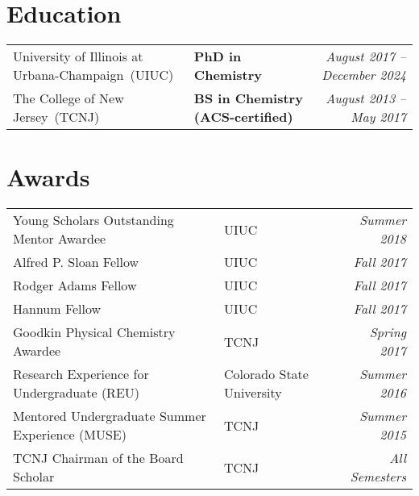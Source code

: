 \documentclass[letterpaper,10pt]{article}
\newcommand{\sectionspace}{
\vspace{-17pt}
}
\begin{document}
\section{\textcolor{color1}{Education}}
\vspace{-3pt}
{
	\setlength\tabcolsep{0pt}
	\begin{tabular*}{\linewidth}{@{\extracolsep{\fill}} llr}
		University of Illinois at Urbana-Champaign~(UIUC) & \textbf{PhD in Chemistry} & \textcolor{color2}{\textit{August 2017 -- December 2024}}\\
		The College of New Jersey~(TCNJ) & \textbf{BS in Chemistry (ACS-certified)} & \textcolor{color2}{\textit{August 2013 -- May 2017}}\\
	\end{tabular*}
}
\sectionspace
\vspace{3pt}

\section{\textcolor{color1}{Awards}}
{
	\setlength\tabcolsep{0pt}
	\begin{tabular*}{\linewidth}{@{\extracolsep{\fill}} llr}
		Young Scholars Outstanding Mentor Awardee & UIUC & \textcolor{color2}{\textit{Summer 2018}}\\
		Alfred P. Sloan Fellow & UIUC & \textcolor{color2}{\textit{Fall 2017}}\\
		Rodger Adams Fellow & UIUC & \textcolor{color2}{\textit{Fall 2017}}\\
		Hannum Fellow & UIUC & \textcolor{color2}{\textit{Fall 2017}}\\
		Goodkin Physical Chemistry Awardee & TCNJ & \textcolor{color2}{\textit{Spring 2017}}\\
		Research Experience for Undergraduate (REU) & Colorado State University & \textcolor{color2}{\textit{Summer 2016}}\\
		Mentored Undergraduate Summer Experience (MUSE) & TCNJ & \textcolor{color2}{\textit{Summer 2015}}\\
		TCNJ Chairman of the Board Scholar & TCNJ & \textcolor{color2}{\textit{All Semesters}}\\
	\end{tabular*}
}
\sectionspace
\vspace{6pt}
\end{document}
